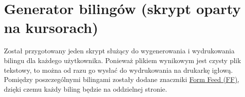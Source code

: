\section{Generator bilingów (skrypt oparty na kursorach)}

Został przygotowany jeden skrypt służący do wygenerowania i wydrukowania bilingu dla każdego użytkownika. Ponieważ plikiem wynikowym jest czysty plik tekstowy, to można od razu go wysłać do wydrukowania na drukarkę igłową. Pomiędzy poszczególnymi bilingami zostały dodane znaczniki \href{https://www.computerhope.com/jargon/f/formfeed.htm}{Form Feed (FF)}, dzięki czemu każdy biling będzie na oddzielnej stronie.



